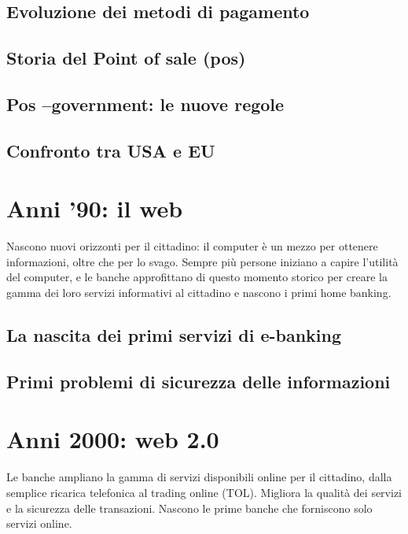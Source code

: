 \documentclass[aip, reprint]{article}
\begin{document}
\subsection{Evoluzione dei metodi di pagamento} 
\subsection{Storia del Point of sale (pos)}
\subsection{Pos –government: le nuove regole}
\subsection{Confronto tra USA e EU}

\newpage
\section{Anni '90: il web}
Nascono nuovi orizzonti per il cittadino: il computer è un mezzo per ottenere informazioni, oltre che per lo svago. Sempre più persone iniziano a capire l’utilità del computer, e le banche approfittano di questo momento storico per creare la gamma dei loro servizi informativi al cittadino e nascono i primi home banking.
\subsection{La nascita dei primi servizi di e-banking}
\subsection{Primi problemi di sicurezza delle informazioni}



\newpage
\section{Anni 2000: web 2.0}
Le banche ampliano la gamma di servizi disponibili online per il cittadino, dalla semplice ricarica telefonica al trading online (TOL).
Migliora la qualità dei servizi e la sicurezza delle transazioni. 
Nascono le prime banche che forniscono solo servizi online.
\end{document}
